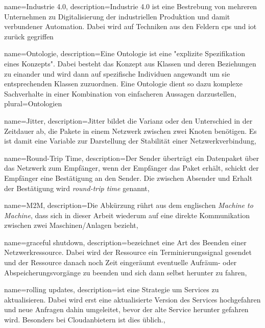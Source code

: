 {
  name={Industrie 4.0},
  description={Industrie 4.0 ist eine Bestrebung von mehreren Unternehmen zu Digitalisierung der industriellen Produktion und damit verbundener Automation. Dabei wird auf Techniken aus den Feldern \acrshort{cps} und \acrshort{iot} zurück gegriffen}
}

{
  name={Ontologie},
  description={Eine Ontologie ist eine "explizite Spezifikation eines Konzepts". \cite{guarino2009ontology} Dabei besteht das Konzept aus Klassen und deren Beziehungen zu einander und wird dann auf spezifische Individuen angewandt um sie entsprechenden Klassen zuzuordnen. Eine Ontologie dient so dazu komplexe Sachverhalte in einer Kombination von einfacheren Aussagen darzustellen},
  plural={Ontologien}
}

{
  name={Jitter},
  description={Jitter bildet die Varianz oder den Unterschied in der Zeitdauer ab, die Pakete in einem Netzwerk zwischen zwei Knoten benötigen. Es ist damit eine Variable zur Darstellung der Stabilität einer Netzwerkverbindung},
}

{
  name={Round-Trip Time},
  description={Der Sender überträgt ein Datenpaket über das Netzwerk zum Empfänger, wenn der Empfänger das Paket erhält, schickt der Empfänger eine Bestätigung an den Sender. Die zwischen Absender und Erhalt der Bestätigung wird \textit{round-trip time} genannt},
}

{
  name={M2M},
  description={Die Abkürzung rührt aus dem englischen \textit{Machine to Machine}, dass sich in dieser Arbeit wiederum auf eine direkte Kommunikation zwischen zwei Maschinen/Anlagen bezieht},
}

{
  name={graceful shutdown},
  description={bezeichnet eine Art des Beenden einer Netzwerkressource. Dabei wird der Ressource ein Terminierungssignal gesendet und der Ressource danach noch Zeit eingeräumt eventuelle Aufräum- oder Abspeicherungsvorgänge zu beenden und sich dann selbst herunter zu fahren},
}

{
  name={rolling updates},
  description={ist eine Strategie um Services zu aktualisieren. Dabei wird erst eine aktualisierte Version des Services hochgefahren und neue Anfragen dahin umgeleitet, bevor der alte Service herunter gefahren wird. Besonders bei Cloudanbietern ist dies üblich.},
}